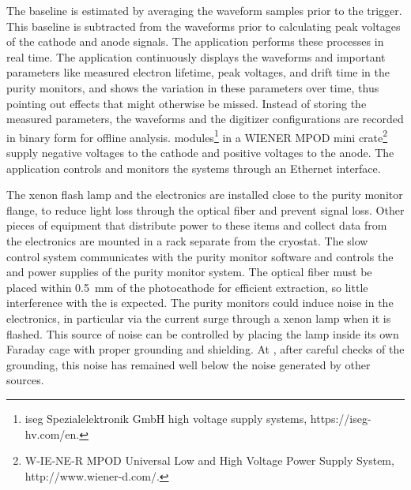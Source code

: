The baseline  is estimated by averaging the waveform samples prior to the trigger. This baseline is subtracted from the waveforms prior to calculating peak voltages of the cathode and anode signals. %
The application performs these processes in real time. %
 The application continuously displays the waveforms and important parameters like measured electron lifetime, peak voltages, and drift time %
in the purity monitors, and shows the variation in these parameters over time, thus pointing out %
effects that might otherwise be missed. %
Instead of storing the measured parameters, the waveforms and the digitizer configurations are recorded in binary form for offline analysis.   modules\footnote{iseg Spezialelektronik GmbH\texttrademark{} high voltage supply systems, https://iseg-hv.com/en.} in a WIENER MPOD mini crate\footnote{W-IE-NE-R MPOD\texttrademark{} Universal Low and High Voltage Power Supply System, http://www.wiener-d.com/.} supply negative voltages to the cathode and positive voltages to the anode. The   application controls and monitors the  systems through an Ethernet interface.

The xenon flash lamp and the  electronics are installed close to the purity monitor flange, to reduce light loss through the optical fiber and prevent signal loss. Other pieces of equipment that distribute power to these items and collect data from the electronics are mounted in a rack separate from the cryostat. The slow control system communicates with the purity monitor  software and controls  the  and  power supplies of the purity monitor system. The optical fiber must be placed within  \SI{0.5}{\milli\meter} of the photocathode for efficient \phel extraction, so little interference with the  is expected. The purity monitors could induce noise in the  electronics, in particular via the current surge through a xenon lamp when it is flashed.  This source of noise can be controlled by placing the lamp inside its own Faraday cage with %
proper grounding and shielding. %
At , after careful checks of the grounding, this noise has remained well below the noise generated by other sources.

